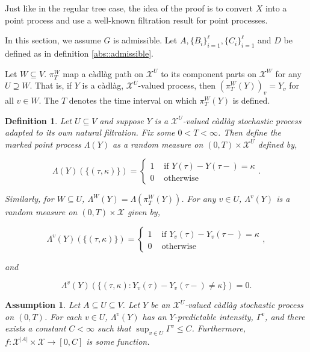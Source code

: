 \documentclass[12pt]{article}
\newcommand{\mc}{\mathcal}
\newcommand{\ra}{\rightarrow}
\newcommand{\te}{\text}
\newcommand{\ind}{\hspace{24pt}}
\newcommand{\sta}{\mc{X}}							%
\newcommand{\Xf}{X}									%
\newcommand{\proj}{\pi}								%
\newcommand{\vind}[1]{_{#1}}						%
\newcommand{\tme}[1]{(#1)}							%
\newcommand{\pmap}{\Lambda}
\newcommand{\rt}{\tau}
\renewcommand{\mark}{\kappa}
\newcommand{\Xg}{Y}
\newcommand{\ratee}{\Gamma}
\newtheorem{defn}[thms]{Definition}
\newtheorem{assu}[thms]{Assumption}
\begin{document}
Just like in the regular tree case, the idea of the proof is to convert \(\Xf\) into a point process and use a well-known filtration result for point processes.

\ind In this section, we assume \(G\) is admissible. Let \(A,\{B_i\}_{i=1}^\ell, \{C_i\}_{i=1}^\ell\) and \(D\) be defined as in definition \ref{abs::admissible}.

\ind Let \(W\subseteq V\). \(\proj^W_T\) map a c\`adl\`ag path on \(\sta^U\) to its component parts on \(\sta^W\) for any \(U \supseteq W\). That is, if \(\Xg\) is a c\`adl\`ag, \(\sta^U\)-valued process, then \((\proj^W_T(\Xg))\vind{v} = \Xg\vind{v}\) for all \(v \in W\). The \(T\) denotes the time interval on which \(\proj^W_T(\Xg)\) is defined.

\begin{defn}
Let \(U\subseteq V\) and suppose \(\Xg\) is a \(\sta^U\)-valued c\`adl\`ag stochastic process adapted to its own natural filtration. Fix some \(0 < T < \infty\). Then define the marked point process \(\pmap(\Xg)\) as a random measure on \((0,T) \times \sta^U\) defined by,

\[\pmap(\Xg)(\{(\rt,\mark)\}) = \begin{cases}
1 &\te{ if } \Xg\tme{\rt} - \Xg\tme{\rt-} = \mark\\
0 &\te{ otherwise}
\end{cases}.\]

Similarly, for \(W \subseteq U\), \(\pmap^W(\Xg) = \pmap\left(\proj^W_{T}(\Xg)\right)\). For any \(v\in U\), \(\pmap^{v}(\Xg)\) is a random measure on \((0,T) \times \sta\) given by,

\[\pmap^{v}(\Xg)(\{(\rt,\mark)\}) = \begin{cases}
1 &\te{ if } \Xg\vind{v}\tme{\rt} - \Xg\vind{v}\tme{\rt-} = \mark\\
0 &\te{ otherwise}
\end{cases},\]

and

\[\pmap^{v}(\Xg)(\{(\rt,\mark): \Xg\vind{v}\tme{\rt} - \Xg\vind{v}\tme{\rt-} \neq \mark\}) = 0.\]
\label{Ex::pmap}
\end{defn}

\begin{assu}
Let \(A\subseteq U \subseteq V\). Let \(\Xg\) be an \(\sta^U\)-valued c\`adl\`ag stochastic process on \((0,T)\). For each \(v\in U\), \(\pmap^{v}(\Xg)\) has an \(\Xg\)-predictable intensity, \(\ratee^{v}\), and there exists a constant \(C < \infty\) such that \(\sup_{v\in U} \ratee^{v} \leq C\). Furthermore, \(f: \sta^{|A|}\times \sta\ra[0,C]\) is some function.
\label{Ex::Eassu}
\end{assu}
\end{document}
